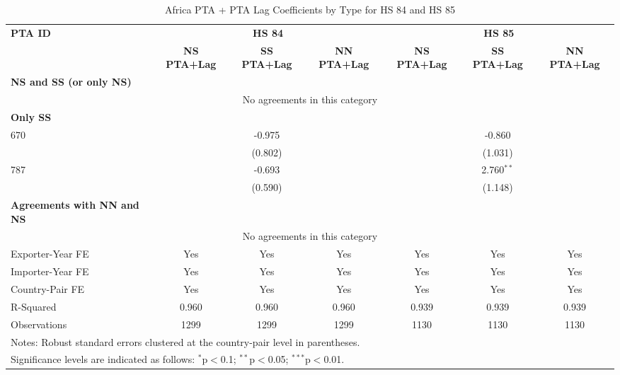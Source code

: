 \begin{table}[htbp]
    \centering
    \caption{Africa PTA + PTA Lag Coefficients by Type for HS 84 and HS 85}
    \label{tab:epuv_africa_pta}
    \begin{adjustbox}{max width=\textwidth}
    \begin{tabular}{lcccccc}
    \hline
    \textbf{PTA ID} & \multicolumn{3}{c}{\textbf{HS 84}} & \multicolumn{3}{c}{\textbf{HS 85}} \\
    & \textbf{NS PTA+Lag} & \textbf{SS PTA+Lag} & \textbf{NN PTA+Lag} & \textbf{NS PTA+Lag} & \textbf{SS PTA+Lag} & \textbf{NN PTA+Lag} \\
    \hline
    \textbf{NS and SS (or only NS)} &  &  &  &  &  &  \\
    \hline
    \multicolumn{7}{c}{No agreements in this category} \\
    \hline
    \textbf{Only SS} &  &  &  &  &  &  \\
    \hline
    670 &  & -0.975 &  &  & -0.860 &  \\
     &  & (0.802) &  &  & (1.031) &  \\
    787 &  & -0.693 &  &  & 2.760$^{\ast\ast}$ &  \\
     &  & (0.590) &  &  & (1.148) &  \\
    \hline
    \textbf{Agreements with NN and NS} &  &  &  &  &  &  \\
    \hline
    \multicolumn{7}{c}{No agreements in this category} \\
    \hline
    Exporter-Year FE & Yes & Yes & Yes & Yes & Yes & Yes \\
    Importer-Year FE & Yes & Yes & Yes & Yes & Yes & Yes \\
    Country-Pair FE & Yes & Yes & Yes & Yes & Yes & Yes \\
    R-Squared & 0.960 & 0.960 & 0.960 & 0.939 & 0.939 & 0.939 \\
    Observations & 1299 & 1299 & 1299 & 1130 & 1130 & 1130 \\
    \hline
    \multicolumn{7}{l}{\footnotesize{Notes: Robust standard errors clustered at the country-pair level in parentheses.}} \\
    \multicolumn{7}{l}{\footnotesize{Significance levels are indicated as follows: $^{\ast}$p$<$0.1; $^{\ast\ast}$p$<$0.05; $^{\ast\ast\ast}$p$<$0.01.}} \\
    \end{tabular}
    \end{adjustbox}
\end{table}
